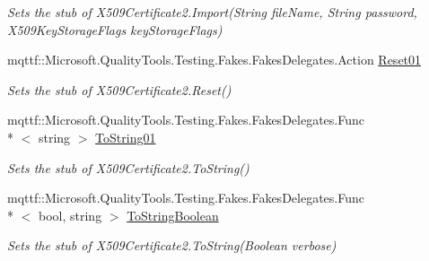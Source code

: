 \begin{DoxyCompactItemize}
\begin{DoxyCompactList}\small\item\em Sets the stub of X509\-Certificate2.\-Import(\-String file\-Name, String password, X509\-Key\-Storage\-Flags key\-Storage\-Flags)\end{DoxyCompactList}\item 
mqttf\-::\-Microsoft.\-Quality\-Tools.\-Testing.\-Fakes.\-Fakes\-Delegates.\-Action \hyperlink{class_system_1_1_security_1_1_cryptography_1_1_x509_certificates_1_1_fakes_1_1_stub_x509_certificate2_aa68614b40e52283e1f991d09705c85f6}{Reset01}
\begin{DoxyCompactList}\small\item\em Sets the stub of X509\-Certificate2.\-Reset()\end{DoxyCompactList}\item 
mqttf\-::\-Microsoft.\-Quality\-Tools.\-Testing.\-Fakes.\-Fakes\-Delegates.\-Func\\*
$<$ string $>$ \hyperlink{class_system_1_1_security_1_1_cryptography_1_1_x509_certificates_1_1_fakes_1_1_stub_x509_certificate2_a4ea292d363d6eba85f9caff9245d7b9a}{To\-String01}
\begin{DoxyCompactList}\small\item\em Sets the stub of X509\-Certificate2.\-To\-String()\end{DoxyCompactList}\item 
mqttf\-::\-Microsoft.\-Quality\-Tools.\-Testing.\-Fakes.\-Fakes\-Delegates.\-Func\\*
$<$ bool, string $>$ \hyperlink{class_system_1_1_security_1_1_cryptography_1_1_x509_certificates_1_1_fakes_1_1_stub_x509_certificate2_a3e4dbc90fecc53cb126bb2bd852cafcb}{To\-String\-Boolean}
\begin{DoxyCompactList}\small\item\em Sets the stub of X509\-Certificate2.\-To\-String(\-Boolean verbose)\end{DoxyCompactList}\end{DoxyCompactItemize}
